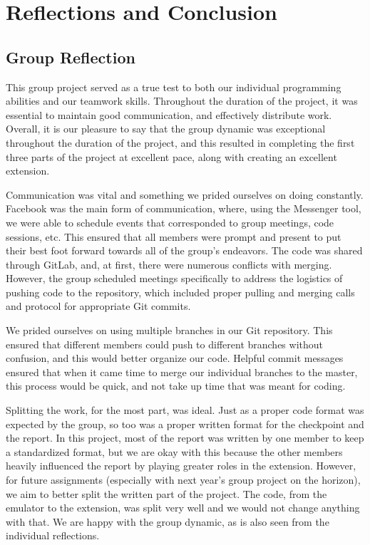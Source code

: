 \documentclass[11pt]{article}
\begin{document}
\section{Reflections and Conclusion}

\subsection{Group Reflection}

This group project served as a true test to both our individual programming abilities and our teamwork skills. Throughout the duration of the project, it was essential to maintain good communication, and effectively distribute work. Overall, it is our pleasure to say that the group dynamic was exceptional throughout the duration of the project, and this resulted in completing the first three parts of the project at excellent pace, along with creating an excellent extension.

\vspace{0.2in}

Communication was vital and something we prided ourselves on doing constantly. Facebook was the main form of communication, where, using the Messenger tool, we were able to schedule events that corresponded to group meetings, code sessions, etc. This ensured that all members were prompt and present to put their best foot forward towards all of the group's endeavors. The code was shared through GitLab, and, at first, there were numerous conflicts with merging. However, the group scheduled meetings specifically to address the logistics of pushing code to the repository, which included proper pulling and merging calls and protocol for appropriate Git commits.

\vspace{0.2in}

We prided ourselves on using multiple branches in our Git repository. This ensured that different members could push to different branches without confusion, and this would better organize our code. Helpful commit messages ensured that when it came time to merge our individual branches to the master, this process would be quick, and not take up time that was meant for coding.

\vspace{0.2in}

Splitting the work, for the most part, was ideal. Just as a proper code format was expected by the group, so too was a proper written format for the checkpoint and the report. In this project, most of the report was written by one member to keep a standardized format, but we are okay with this because the other members heavily influenced the report by playing greater roles in the extension. However, for future assignments (especially with next year's group project on the horizon), we aim to better split the written part of the project. The code, from the emulator to the extension, was split very well and we would not change anything with that. We are happy with the group dynamic, as is also seen from the individual reflections.
\end{document}
